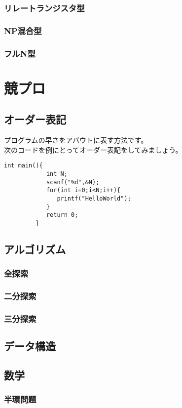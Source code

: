 \documentclass{jarticle}
\begin{document}
      \subsubsection{リレートランジスタ型}
      \subsubsection{NP混合型}
      \subsubsection{フルN型}
\clearpage
\section{競プロ}
   \subsection{オーダー表記}
      プログラムの早さをアバウトに表す方法です。
      \\次のコードを例にとってオーダー表記をしてみましょう。
      \begin{lstlisting}[basicstyle=\ttfamily,frame=single]
         int main(){
            int N;
            scanf("%d",&N);
            for(int i=0;i<N;i++){
               printf("HelloWorld");
            }
            return 0;
         }
      \end{lstlisting}
   \subsection{アルゴリズム}
      \subsubsection{全探索}
      \subsubsection{二分探索}
      \subsubsection{三分探索}
   \subsection{データ構造}
   \subsection{数学}
      \subsubsection{半環問題}
\clearpage
\end{document}
